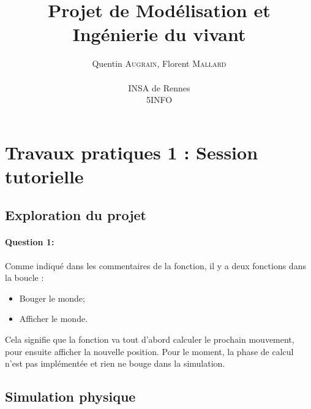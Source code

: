 \documentclass[a4paper,12pt]{article}
\author{
  Quentin \textsc{Augrain}, Florent \textsc{Mallard} \\ \\
  INSA de Rennes \\
  5INFO
}
\title{Projet de Modélisation et Ingénierie du vivant}
\begin{document}
\maketitle
\newpage
\tableofcontents
\newpage

\section{Travaux pratiques 1 : Session tutorielle}
\subsection{Exploration du projet}

\paragraph{Question 1:} Comme indiqué dans les commentaires de la fonction, il y a deux fonctions dans la boucle :
\begin{itemize}
    \item Bouger le monde;
    \item Afficher le monde.
\end{itemize}

Cela signifie que la fonction va tout d'abord calculer le prochain mouvement, pour ensuite afficher la nouvelle position. Pour le moment, la phase de calcul n'est pas implémentée et rien ne bouge dans la simulation.

\subsection{Simulation physique}
\end{document}
